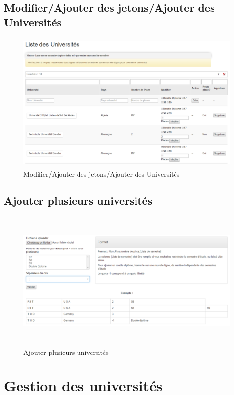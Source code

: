  
  \subsection{Modifier/Ajouter des jetons/Ajouter des Universités}
  \begin{figure}[H]
  	\centering
  	
  	\includegraphics[width=14cm,height=7cm]{Images/Admin/gestion_univ_admin.png}
  	\caption{Modifier/Ajouter des jetons/Ajouter des Universités}
  	\label{gua}
  \end{figure}


  \subsection{Ajouter plusieurs universités}
  \begin{figure}[H]
  	\centering
  	
  	\includegraphics[width=14cm,height=7cm]{Images/Admin/ajout_plusieux_univ_admin.png}
  	\caption{Ajouter plusieurs universités}
  	\label{pua}
  \end{figure}

\section{Gestion des universités}


